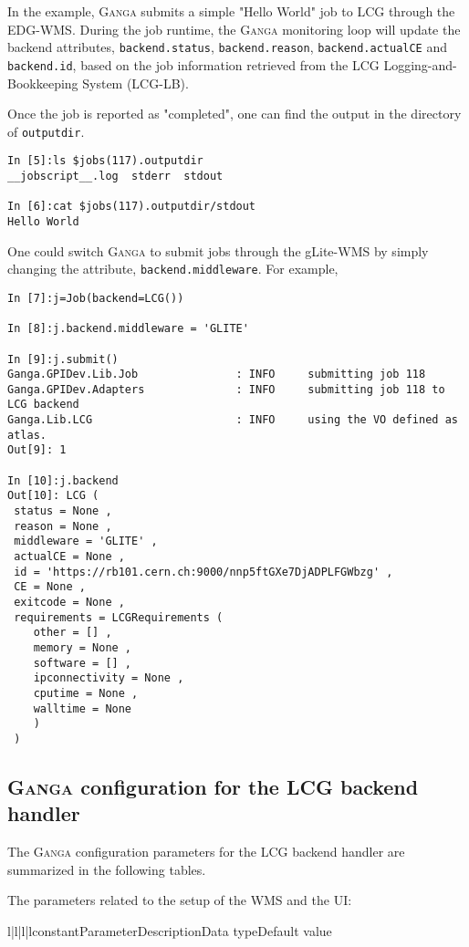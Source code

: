 \documentclass{howto}
\def\ganga {\textsc{Ganga}\xspace}
\begin{document}
In the example, \ganga submits a simple "Hello World" job to LCG through the
EDG-WMS. During the job runtime, the \ganga monitoring loop will update the
backend attributes, \texttt{backend.status}, \texttt{backend.reason}, \texttt{backend.actualCE} and
\texttt{backend.id}, based on the job information retrieved from the LCG
Logging-and-Bookkeeping System (LCG-LB).

Once the job is reported as "completed", one can find the output in the directory of \texttt{outputdir}.
\begin{verbatim}
In [5]:ls $jobs(117).outputdir
__jobscript__.log  stderr  stdout

In [6]:cat $jobs(117).outputdir/stdout
Hello World
\end{verbatim}

One could switch \ganga to submit jobs through the gLite-WMS by simply
changing the attribute, \texttt{backend.middleware}. For example,
\begin{verbatim}
In [7]:j=Job(backend=LCG())

In [8]:j.backend.middleware = 'GLITE'

In [9]:j.submit()
Ganga.GPIDev.Lib.Job               : INFO     submitting job 118
Ganga.GPIDev.Adapters              : INFO     submitting job 118 to LCG backend
Ganga.Lib.LCG                      : INFO     using the VO defined as atlas.
Out[9]: 1

In [10]:j.backend
Out[10]: LCG (
 status = None ,
 reason = None ,
 middleware = 'GLITE' ,
 actualCE = None ,
 id = 'https://rb101.cern.ch:9000/nnp5ftGXe7DjADPLFGWbzg' ,
 CE = None ,
 exitcode = None ,
 requirements = LCGRequirements (
    other = [] ,
    memory = None ,
    software = [] ,
    ipconnectivity = None ,
    cputime = None ,
    walltime = None
    )
 )
\end{verbatim}

\subsection{\ganga configuration for the LCG backend handler}
The \ganga configuration parameters for the LCG backend handler are summarized
in the following tables.

The parameters related to the setup of the WMS and the UI:
\begin{tableiv}{l|l|l|l}{constant}{Parameter}{Description}{Data type}{Default value}
\end{tableiv}
\end{document}
